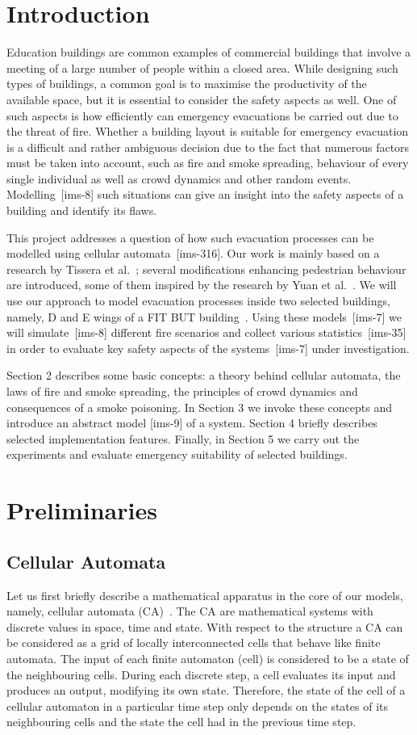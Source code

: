 \section{Introduction}
Education buildings are common examples of commercial buildings that involve a
meeting of a large number of people within a closed area.
While designing such types of buildings, a common goal is to maximise the
productivity of the available space, but it is essential to consider the
safety aspects as well.
One of such aspects is how efficiently can emergency evacuations be carried out
due to the threat of fire.
Whether a building layout is suitable for emergency evacuation is a difficult
and rather ambiguous decision due to the fact that numerous factors must be
taken into account, such as fire and smoke spreading, behaviour of every single
individual as well as crowd dynamics and other random events.
Modelling~[ims-8] such situations can give an insight into the safety aspects
of a building and identify its flaws.

This project addresses a question of how such evacuation processes can be
modelled using cellular automata~[ims-316].
Our work is mainly based on a research by Tissera et al.~\cite{Tissera1};
several modifications enhancing pedestrian behaviour are introduced, some of
them inspired by the research by Yuan et al.~\cite{Yuan}.
We will use our approach to model evacuation processes inside two selected
buildings, namely, D and E wings of a FIT BUT building~\cite{FIT}.
Using these models~[ims-7] we will simulate~[ims-8] different fire scenarios and
collect various statistics~[ims-35] in order to evaluate key safety aspects of
the systems~[ims-7] under investigation.

Section 2 describes some basic concepts: a theory behind cellular automata,
the laws of fire and smoke spreading, the principles of crowd dynamics and
consequences of a smoke poisoning.
In Section 3 we invoke these concepts and introduce an abstract model [ims-9]
of a system.
Section 4 briefly describes selected implementation features.
Finally, in Section 5 we carry out the experiments and evaluate emergency
suitability of selected buildings.

\section{Preliminaries}
\subsection{Cellular Automata}
Let us first briefly describe a mathematical apparatus in the core of our
models, namely, cellular automata (CA)~\cite{Wolfram}.
The CA are mathematical systems with discrete values in space, time and
state.
With respect to the structure a CA can be considered as a grid of locally
interconnected cells that behave like finite automata.
The input of each finite automaton (cell) is considered to be a state of the
neighbouring cells.
During each discrete step, a cell evaluates its input and produces an
output, modifying its own state.
Therefore, the state of the cell of a cellular automaton in a particular time
step only depends on the states of its neighbouring cells and the state the
cell had in the previous time step.

